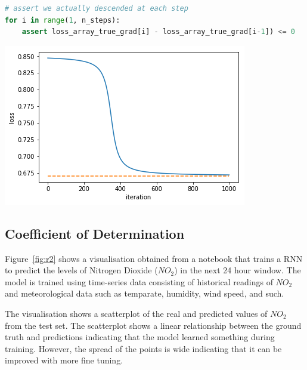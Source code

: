 \documentclass[acmsmall,screen,review,anonymous]{acmart}
\begin{document}
\begin{minipage}{0.5\textwidth}
  \begin{lstlisting}[language=Python]
# assert we actually descended at each step
for i in range(1, n_steps):
    assert loss_array_true_grad[i] - loss_array_true_grad[i-1]) <= 0
  \end{lstlisting}
  \label{lst:loss-strict}
\end{minipage}
\begin{minipage}{0.5\textwidth}
  \includegraphics[width=\linewidth]{../catalogue/select-267.png}
  \label{fig:loss-strict}
\end{minipage}

\subsection{Coefficient of Determination}

Figure~\ref{fig:r2} shows a visualisation obtained from a notebook that trains a RNN to predict the levels of Nitrogen Dioxide ($NO_2$) in the next 24 hour window. The model is trained using time-series data consisting of historical readings of $NO_2$ and meteorological data such as temparate, humidity, wind speed, and such.

The visualisation shows a scatterplot of the real and predicted values of $NO_2$ from the test set. The scatterplot shows a linear relationship between the ground truth and predictions indicating that the model learned something during training. However, the spread of the points is wide indicating that it can be improved with more fine tuning.
\end{document}
